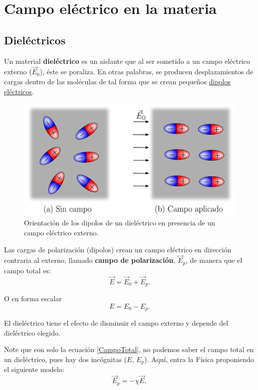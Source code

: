 \section{Campo eléctrico en la materia}

\subsection{Dieléctricos}

Un material \textbf{dieléctrico} es un aislante que al ser sometido a un campo eléctrico externo ($\vec{E}_0$), éste se poraliza. En otras palabras, se producen desplazamientos de cargas dentro de las moléculas de tal forma que se crean pequeños \underline{dipolos eléctricos}.

\begin{figure}[H]
    \centering
    \includegraphics[scale = 0.5]{Figuras/Dielectrico.pdf}
    \caption{Orientación de los dipolos de un dieléctrico en presencia de un campo eléctrico externo.}
    \label{fig:Dielectrico}
\end{figure}

Las cargas de polarización (dipolos) crean un campo eléctrico en dirección contraria al externo, llamado \textbf{campo de polarización}, $\vec{E}_p$, de manera que el campo total es:
$$\vec{E} = \vec{E}_0 + \vec{E}_p.$$

O en forma escalar 
\begin{equation}
E = E_0 - E_p. \label{CampoTotal}
\end{equation}

El dieléctrico tiene el efecto de disminuir el campo externo y depende del dieléctrico elegido.

Note que con solo la ecuación \eqref{CampoTotal}, no podemos saber el campo total en un dieléctrico, pues hay dos incógnitas ($E$, $E_p$). Aquí, entra la Física proponiendo el siguiente modelo:
$$\vec{E}_p = - \chi \vec{E},$$

